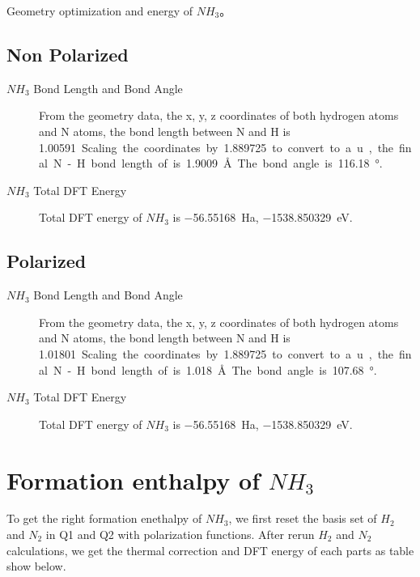 \documentclass{article}
\begin{document}
Geometry optimization and energy of $NH_{3}$。

\subsection{Non Polarized}
\begin{description}
\item[$NH_{3}$ Bond Length and Bond Angle]
From the geometry data, the x, y, z coordinates of both hydrogen atoms and N atoms, the bond length between N and H is \SI{1.00591}. Scaling the coordinates by \SI{1.889725} to convert to a.u., the final N-H bond length of is \SI{1.9009}{\angstrom}. The bond angle is \SI{116.18}{\degree}.
\item[$NH_{3}$ Total DFT Energy]
Total DFT energy of $NH_{3}$ is \SI{-56.55168}{Ha}, \SI{-1538.850329}{\eV}.	
\end{description} 

\subsection{Polarized}
\begin{description}
\item[$NH_{3}$ Bond Length and Bond Angle]
From the geometry data, the x, y, z coordinates of both hydrogen atoms and N atoms, the bond length between N and H is \SI{1.01801}. Scaling the coordinates by \SI{1.889725} to convert to a.u., the final N-H bond length of is \SI{1.018}{\angstrom}. The bond angle is \SI{107.68}{\degree}.
\item[$NH_{3}$ Total DFT Energy]
Total DFT energy of $NH_{3}$ is \SI{-56.55168}{Ha}, \SI{-1538.850329}{\eV}.
\end{description}



\section{Formation enthalpy of $NH_{3}$}

To get the right formation enethalpy of $NH_{3}$, we first reset the basis set of $H_{2}$ and $N_{2}$ in Q1 and Q2 with polarization functions. After rerun $H_{2}$ and $N_{2}$ calculations, we get the thermal correction and DFT energy of each parts as table show below.
\end{document}
